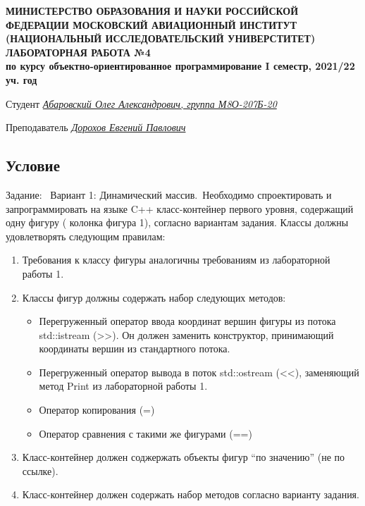 \documentclass[12pt]{article}
\begin{document}
\begin{titlepage}
\begin{center}
\textbf{МИНИСТЕРСТВО ОБРАЗОВАНИЯ И НАУКИ РОССИЙСКОЙ ФЕДЕРАЦИИ
\medskip
МОСКОВСКИЙ АВИАЦИОННЫЙ ИНСТИТУТ
(НАЦИОНАЛЬНЫЙ ИССЛЕДОВАТЕЛЬСКИЙ УНИВЕРСТИТЕТ)
\vfill\vfill
{\Huge ЛАБОРАТОРНАЯ РАБОТА №4} \\
по курсу объектно-ориентированное программирование
I семестр, 2021/22 уч. год}
\end{center}
\vfill

Студент \uline{\it {Абаровский Олег Александрович, группа М8О-207Б-20}\hfill}

Преподаватель \uline{\it {Дорохов Евгений Павлович}\hfill}

\vfill
\end{titlepage}

\subsection*{Условие}

Задание: \
Вариант 1: Динамический массив.\
Необходимо спроектировать и запрограммировать на языке C++ класс-контейнер первого уровня, содержащий одну фигуру ( колонка фигура 1), согласно вариантам задания. Классы должны удовлетворять следующим правилам:
\begin{enumerate}
\item Требования к классу фигуры аналогичны требованиям из лабораторной работы 1.
\item Классы фигур должны содержать набор следующих методов:
\begin{itemize}
    \item Перегруженный оператор ввода координат вершин фигуры из потока std::istream (>>). Он должен заменить конструктор, принимающий координаты вершин из стандартного потока.
    \item Перегруженный оператор вывода в поток std::ostream (<<), заменяющий метод Print из лабораторной работы 1. 
    \item Оператор копирования (=)
    \item Оператор сравнения с такими же фигурами (==)
\end{itemize}
\item Класс-контейнер должен соджержать объекты фигур “по значению” (не по ссылке).
\item Класс-контейнер должен содержать набор методов согласно варианту задания.
\end{enumerate}
\end{document}
